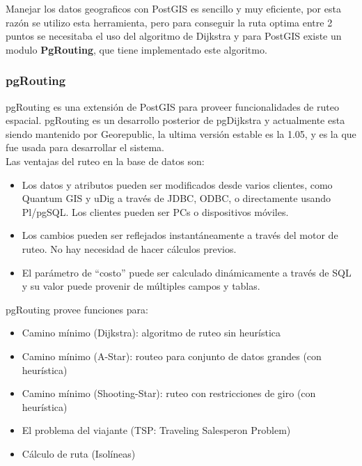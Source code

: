       Manejar los datos geograficos con PostGIS es sencillo y muy eficiente, por esta raz\'on se utilizo esta herramienta, pero para conseguir la ruta optima entre 2 puntos se necesitaba el uso del algoritmo de Dijkstra y para PostGIS existe un modulo \textbf{PgRouting}, que tiene implementado este algoritmo.
      
      \subsubsection{pgRouting} %
      \label{sec:pgrouting}
        pgRouting es una extensi\'on  de  PostGIS para proveer funcionalidades de ruteo espacial. pgRouting es un desarrollo posterior de pgDijkstra y actualmente esta siendo mantenido por Georepublic, la ultima versi\'on estable es la 1.05, y es la que fue usada para desarrollar el sistema.\\

        Las ventajas del ruteo en la base de datos son:
        \begin{itemize}
          \item Los datos y atributos pueden ser modificados desde varios clientes, como Quantum GIS y uDig a través de JDBC, ODBC, o directamente usando Pl/pgSQL. Los clientes pueden ser PCs o dispositivos móviles.
          \item Los cambios pueden ser reflejados instantáneamente a través del motor de ruteo. No hay necesidad de hacer cálculos previos.
          \item El parámetro de ``costo'' puede ser calculado dinámicamente a través de SQL y su valor puede provenir de múltiples campos y tablas.
        \end{itemize}

        pgRouting provee funciones para:
        \begin{itemize}
          \item Camino mínimo (Dijkstra): algoritmo de ruteo sin heurística
          \item Camino mínimo (A-Star): routeo para conjunto de datos grandes (con heurística)
          \item Camino mínimo (Shooting-Star): ruteo con restricciones de giro (con heurística)
          \item El problema del viajante (TSP: Traveling Salesperon Problem)
          \item Cálculo de ruta (Isolíneas)
        \end{itemize}
        
